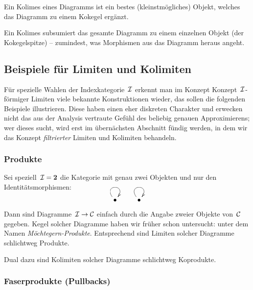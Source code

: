 \begin{motto}Ein Kolimes eines Diagramms ist ein bestes
(kleinstmögliches) Objekt, welches das Diagramm zu einem Kokegel ergänzt.
\end{motto}

\begin{motto}
Ein Kolimes subsumiert das gesamte Diagramm zu einem einzelnen Objekt (der
Kokegelspitze) -- zumindest, was Morphismen aus das Diagramm heraus
angeht.\end{motto}


\subsection{Beispiele für Limiten und Kolimiten}

Für spezielle Wahlen der Indexkategorie~$\mathcal{I}$ erkennt man im Konzept
Konzept~$\mathcal{I}$-förmiger Limiten viele bekannte Konstruktionen wieder, das sollen
die folgenden Beispiele illustrieren. Diese haben einen eher diskreten Charakter
und erwecken nicht das aus der Analysis vertraute Gefühl des beliebig genauen
Approximierens; wer dieses sucht, wird erst im übernächsten Abschnitt fündig
werden, in dem wir das Konzept \emph{filtrierter} Limiten und Kolimiten
behandeln.


\subsubsection*{Produkte}

Sei speziell~$\mathcal{I} = \mathbf{2}$ die Kategorie mit genau zwei Objekten und nur
den Iden\-ti\-täts\-mor\-phis\-men:
\[ \xymatrix{\bullet \ar@(ul,ur) & \bullet \ar@(ul,ur)} \]
Dann sind Diagramme~$\mathcal{I} \to \mathcal{C}$ einfach durch die Angabe zweier Objekte
von~$\mathcal{C}$ gegeben. Kegel solcher Diagramme haben wir früher schon untersucht:
unter dem Namen \emph{Möchtegern-Produkte}. Entsprechend sind Limiten
solcher Diagramme schlichtweg Produkte.

Dual dazu sind Kolimiten solcher Diagramme schlichtweg Koprodukte.


\subsubsection*{Faserprodukte (Pullbacks)}

